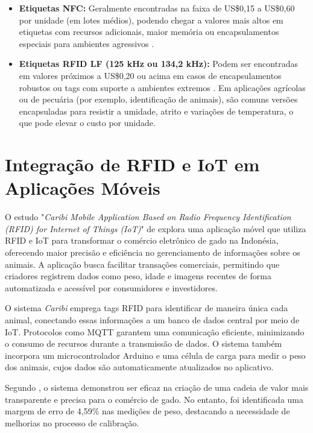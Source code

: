 \begin{itemize}
    \item \textbf{Etiquetas NFC:} Geralmente encontradas na faixa de US\$0,15 a US\$0,60 por unidade (em lotes médios), podendo chegar a valores mais altos em etiquetas com recursos adicionais, maior memória ou encapsulamentos especiais para ambientes agressivos \cite{IDTechEx2023, Alibaba, AliExpress}.

    \item \textbf{Etiquetas RFID LF (125 kHz ou 134,2 kHz):} Podem ser encontradas em valores próximos a US\$0,20 ou acima em casos de encapsulamentos robustos ou tags com suporte a ambientes extremos \cite{IDTechEx2023, Alibaba}. Em aplicações agrícolas ou de pecuária (por exemplo, identificação de animais), são comuns versões encapsuladas para resistir a umidade, atrito e variações de temperatura, o que pode elevar o custo por unidade.

\end{itemize}

\section{Integração de RFID e IoT em Aplicações Móveis}
O estudo "\textit{Caribi Mobile Application Based on Radio Frequency Identification (RFID) for Internet of Things (IoT)}" de \cite{Faridah2022CaribiMA} explora uma aplicação móvel que utiliza RFID e IoT para transformar o comércio eletrônico de gado na Indonésia, oferecendo maior precisão e eficiência no gerenciamento de informações sobre os animais. A aplicação busca facilitar transações comerciais, permitindo que criadores registrem dados como peso, idade e imagens recentes de forma automatizada e acessível por consumidores e investidores.

O sistema \textit{Caribi} emprega tags RFID para identificar de maneira única cada animal, conectando essas informações a um banco de dados central por meio de IoT. Protocolos como MQTT garantem uma comunicação eficiente, minimizando o consumo de recursos durante a transmissão de dados. O sistema também incorpora um microcontrolador Arduino e uma célula de carga para medir o peso dos animais, cujos dados são automaticamente atualizados no aplicativo.

Segundo \cite{Faridah2022CaribiMA}, o sistema demonstrou ser eficaz na criação de uma cadeia de valor mais transparente e precisa para o comércio de gado. No entanto, foi identificada uma margem de erro de 4,59\% nas medições de peso, destacando a necessidade de melhorias no processo de calibração.

